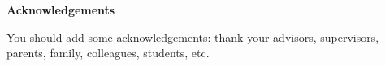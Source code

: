 \thispagestyle{empty}

\centerline{\Large{\textbf{Acknowledgements}}}

\vspace{2cm}

\noindent You should add some acknowledgements: thank your
advisors, supervisors, parents, family, colleagues, students, etc.

\newpage
\thispagestyle{empty}

\rule{0cm}{5cm}